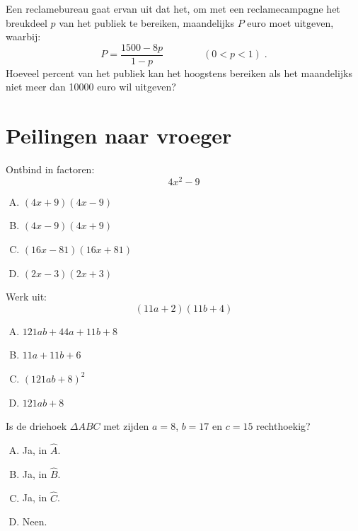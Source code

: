 \documentclass[12pt]{article}
\begin{document}
\begin{oefening}
Een reclamebureau gaat ervan uit dat het, om met een reclamecampagne het breukdeel $p$ van het publiek te bereiken, maandelijks $P$ euro moet uitgeven, waarbij:
$$P=\frac{1500-8p}{1-p} \qquad\qquad (0<p<1)\;.$$
Hoeveel percent van het publiek kan het hoogstens bereiken als het maandelijks niet meer dan 10000 euro wil uitgeven?
\end{oefening}


\section*{Peilingen naar vroeger}

\begin{oefening} Ontbind in factoren:
$$4x^2-9$$
\begin{center}
\begin{enumerate}[(A)]
  \item $(4x+9)(4x-9)$
  \item $(4x-9)(4x+9)$
  \item $(16x-81)(16x+81)$
  \item $(2x-3)(2x+3)$
\end{enumerate}
\end{center}
\end{oefening}

\begin{oefening} Werk uit:
$$(11a+2)(11b+4)$$
\begin{center}
\begin{enumerate}[(A)]
  \item $121ab+44a+11b+8$
  \item $11a+11b+6$
  \item $(121ab+8)^2$
  \item $121ab+8$
\end{enumerate}
\end{center}
\end{oefening}

\begin{oefening} Is de driehoek $\Delta ABC$ met zijden $a=8$, $b=17$ en $c=15$ rechthoekig?
\begin{center}
\begin{enumerate}[(A)]
  \item Ja, in $\hat A$.
  \item Ja, in $\hat B$.
  \item Ja, in $\hat C$.
  \item Neen.
\end{enumerate}
\end{center}
\end{oefening}
\end{document}
